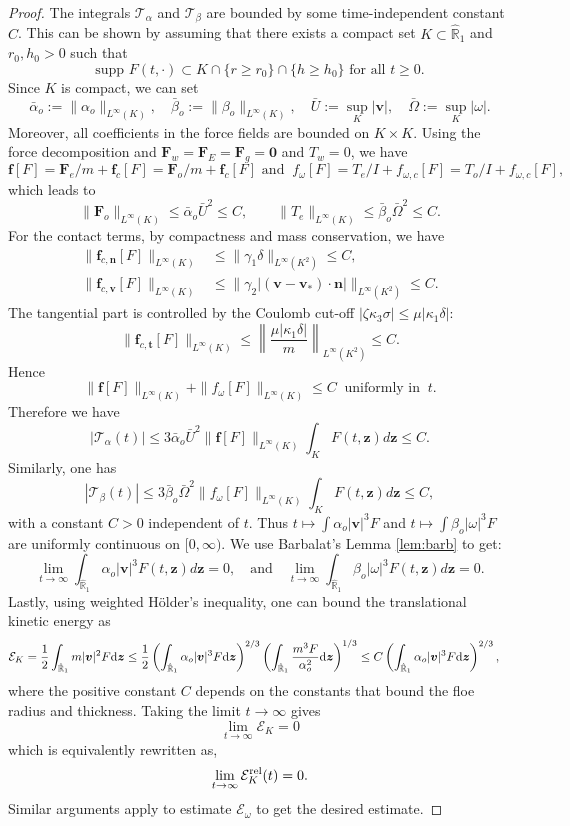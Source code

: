 \documentclass[a4paper,11pt]{article}
\numberwithin{equation}{section}
\theoremstyle{definition}
\newcommand{\bfz}{\boldsymbol{z}}
\newcommand{\bfzr}{\boldsymbol{0}}
\newcommand{\bfv}{\boldsymbol{v}}
\newcommand{\bfn}{\boldsymbol{n}}
\newcommand{\bft}{\boldsymbol{t}}
\newcommand{\bff}{\boldsymbol{f}}
\newcommand{\bfF}{\boldsymbol{F}}
\newcommand{\bbr}{\mathbb R}
\def\d{{  \rm d}}
\newcommand{\T}{\mathcal{T}}
\newcommand{\E}{\mathcal{E}}
\begin{document}
\begin{proof}
The integrals $\T_\alpha$ and $\T_\beta$ are bounded by some time-independent constant $C$. 
This can be shown by assuming that there exists a compact set $K\subset \hat{\mathbb R}_1$ and $r_0,h_0>0$ such that
\[
\text{supp } F(t,\cdot)\subset K\cap \{r\ge r_0\}\cap \{h\ge h_0\} \text{ for all } t\ge0.
\]
Since $K$ is compact, we can set
\[
\bar\alpha_o:=\|\alpha_o\|_{L^\infty(K)},\quad 
\bar\beta_o:=\|\beta_o\|_{L^\infty(K)},\quad 
\bar U:=\sup_{K}|\bfv|,\quad 
\bar\Omega:=\sup_{K}|\omega|.
\]
Moreover, all coefficients in the force fields are bounded on $K\times K$.
Using the force decomposition and $\bfF_w=\bfF_E=\bfF_g=\bfzr$ and $T_w=0$, we have
\[
\bff[F]= \bfF_e/m + \bff_c[F] = \bfF_o/m + \bff_c[F] \text{ and }\ f_\omega[F] = T_e/I +f_{\omega,c}[F] = T_o/I +f_{\omega,c}[F],
\]
which leads to 
\[
\|\bfF_o\|_{L^\infty(K)}\le  \bar\alpha_o\bar U^2\le C,\qquad
\|T_e\|_{L^\infty(K)}\le \bar\beta_o \bar\Omega^2\le C.
\]
For the contact terms, by compactness and mass conservation, we have
\begin{align*}
\|\bff_{c,\bfn}[F] \|_{L^\infty(K)} & \le \|\gamma_1\delta\|_{L^\infty(K^2)} \le C,\\
%
\|\bff_{c,\bfv}[F] \|_{L^\infty(K)} & \le \|\gamma_2|(\bfv-\bfv_*)\cdot\bfn|\|_{L^\infty(K^2)} \le C.
\end{align*}
The tangential part is controlled by the Coulomb cut-off
$|\zeta \kappa_3 \sigma|\le \mu |\kappa_1\delta|$:
\[
\|\bff_{c,\bft}[F] \|_{L^\infty(K)}\le \left\|\frac{\mu|\kappa_1\delta|}{m}\right\|_{L^\infty(K^2)} \le C.
\]
Hence 
\[
\|\bff[F] \|_{L^\infty(K)}+\|f_\omega[F] \|_{L^\infty(K)}\le C\ \text{ uniformly in }\ t.
\]
Therefore we have
\[
|\T_\alpha(t)|
\le 3\bar\alpha_o \bar U^2 \|\bff[F] \|_{L^\infty(K)}\int_K F(t,\bfz) d\bfz
\le C.
\]
Similarly, one has
\[
|\T_\beta(t)|
\le 3\bar\beta_o \bar\Omega^2 \|f_\omega[F] \|_{L^\infty(K)}\int_K F(t,\bfz) d\bfz
\le C,
\]
with a constant $C>0$ independent of $t$.
Thus $t\mapsto \int \alpha_o |\bfv|^3F$ and $t\mapsto \int \beta_o |\omega|^3F$
are uniformly continuous on $[0,\infty)$.
We use Barbalat's Lemma \ref{lem:barb} to get:
\[
\lim_{t\to\infty}\int_{\hat{\bbr}_1}\alpha_o |\bfv|^3 F(t,\bfz)d\bfz=0,\quad\text{and}\quad\lim_{t\to\infty}\int_{\hat{\bbr}_1}\beta_o |\omega|^3 F(t,\bfz)d\bfz=0.
\]
Lastly, using weighted Hölder's inequality, one can bound the translational kinetic energy as
\begin{align*}
    \E_K & = \frac{1}{2} \int_{\hat{\bbr}_1} m|\bfv|^2 F \d \bfz 
    \le \frac12\left(\int_{\hat{\bbr}_1} \alpha_o|\bfv|^3 F \d\bfz\right)^{2/3} \left(\int_{\hat{\bbr}_1}\frac{m^3F }{\alpha_o^2}\d\bfz\right)^{1/3} 
     \le C\left(\int_{\hat{\bbr}_1} \alpha_o|\bfv|^3 F \d\bfz\right)^{2/3}, 
\end{align*}
where the positive constant $C$ depends on the constants that bound the floe radius and thickness. 
Taking the limit $t\to \infty$ gives
\[
\lim_{t\to \infty}\E_K=0
\]
which is equivalently rewritten as,
\[
\lim_{t\to\infty}\E_K^{\rm rel}(t)=0.
\]
Similar arguments apply to estimate $\E_\omega$ to get the desired estimate.
\end{proof}
\color{black}
\end{document}
